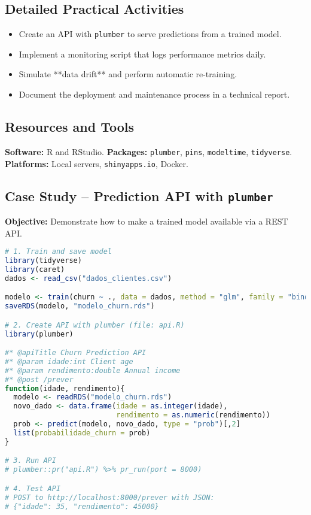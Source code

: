 \subsection{\textcolor{subsectionblue}{Detailed Practical Activities}}
\begin{itemize}
  \item Create an API with \texttt{plumber} to serve predictions from a trained model.
  \item Implement a monitoring script that logs performance metrics daily.
  \item Simulate **data drift** and perform automatic re-training.
  \item Document the deployment and maintenance process in a technical report.
\end{itemize}

\subsection{\textcolor{subsectionblue}{Resources and Tools}}
\begin{itemize}
  \textbf{Software:} R and RStudio.
  \textbf{Packages:} \texttt{plumber}, \texttt{pins}, \texttt{modeltime}, \texttt{tidyverse}.
  \textbf{Platforms:} Local servers, \texttt{shinyapps.io}, Docker.
\end{itemize}

\subsection{\textcolor{subsectionblue}{Case Study – Prediction API with \texttt{plumber}}}
\textbf{Objective:} Demonstrate how to make a trained model available via a REST API.

\begin{lstlisting}[language=R]
# 1. Train and save model
library(tidyverse)
library(caret)
dados <- read_csv("dados_clientes.csv")

modelo <- train(churn ~ ., data = dados, method = "glm", family = "binomial")
saveRDS(modelo, "modelo_churn.rds")

# 2. Create API with plumber (file: api.R)
library(plumber)

#* @apiTitle Churn Prediction API
#* @param idade:int Client age
#* @param rendimento:double Annual income
#* @post /prever
function(idade, rendimento){
  modelo <- readRDS("modelo_churn.rds")
  novo_dado <- data.frame(idade = as.integer(idade),
                          rendimento = as.numeric(rendimento))
  prob <- predict(modelo, novo_dado, type = "prob")[,2]
  list(probabilidade_churn = prob)
}

# 3. Run API
# plumber::pr("api.R") %>% pr_run(port = 8000)

# 4. Test API
# POST to http://localhost:8000/prever with JSON:
# {"idade": 35, "rendimento": 45000}
\end{lstlisting}

